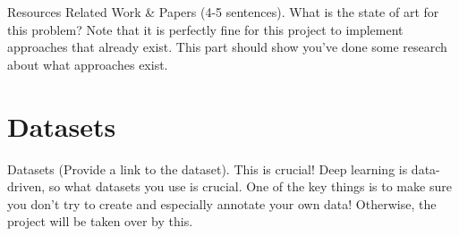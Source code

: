 \documentclass[10pt,twocolumn,letterpaper]{article}
\begin{document}
Resources  Related Work \& Papers (4-5 sentences). What is the state of art for this problem? Note that it is perfectly fine for this project to implement approaches that already exist. This part should show you’ve done some research about what approaches exist.


\section{Datasets}

Datasets (Provide a link to the dataset). This is crucial! Deep learning is data-driven, so what datasets you use is crucial. One of the key things is to make sure you don’t try to create and especially annotate your own data! Otherwise, the project will be taken over by this.
\end{document}
